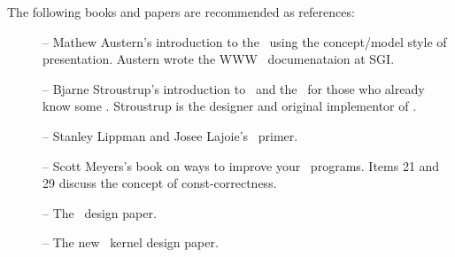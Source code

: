 


The following books and papers are recommended as references:

\begin{description}
   \item[\cite{cgal:a-gps-98}] --  Mathew Austern's introduction to the \stl\ 
        using the concept/model style of presentation.  Austern wrote the 
        WWW \stl\ documenataion at SGI.

   \item[\cite{cgal:s-cpl-97}] -- Bjarne Stroustrup's introduction to
        \CC\ and the \stl\ for those who already know some \CC. 
        Stroustrup is the designer and original implementor of \CC.

   \item[\cite{cgal:ll-cp-98}] -- Stanley Lippman and Josee Lajoie's
     \CC\ primer.

   \item[\cite{cgal:m-ec-97}] -- Scott Meyers's book on ways to improve
        your \CC\ programs.  Items 21 and 29 discuss the concept of 
        const-correctness.

  \item [\cite{fgkss-dccga-00}] -- The \cgal\ design paper. 

  \item [\cite{hhkps-aegk-01}] -- The new \cgal\ kernel design paper. 
\end{description}

\InternalOnly{

}

